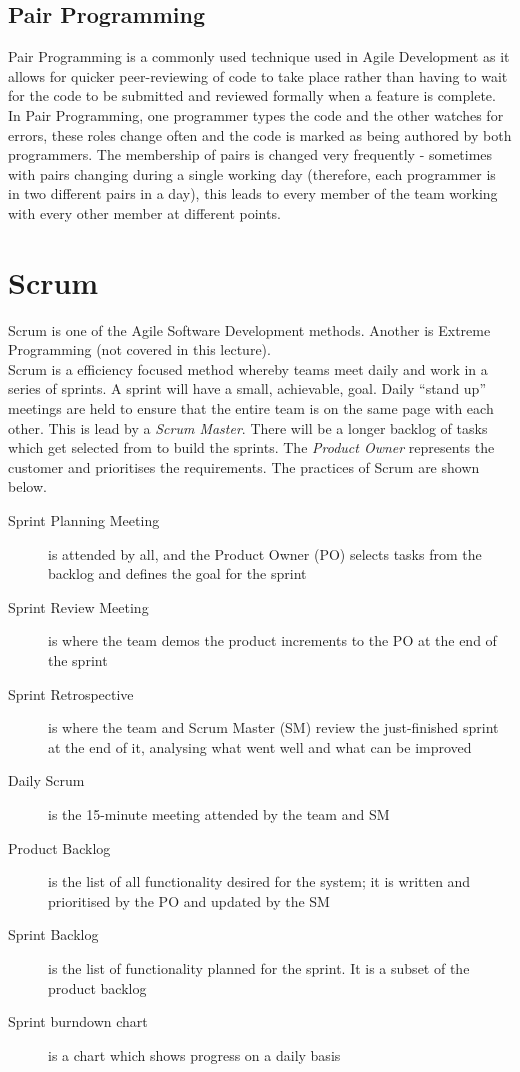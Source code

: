 \subsection{Pair Programming}
Pair Programming is a commonly used technique used in Agile Development as it allows for quicker peer-reviewing of code to take place rather than having to wait for the code to be submitted and reviewed formally when a feature is complete. In Pair Programming, one programmer types the code and the other watches for errors, these roles change often and the code is marked as being authored by both programmers. The membership of pairs is changed very frequently - sometimes with pairs changing during a single working day (therefore, each programmer is in two different pairs in a day), this leads to every member of the team working with every other member at different points.

\section{Scrum}
Scrum is one of the Agile Software Development methods. Another is Extreme Programming (not covered in this lecture).\\

Scrum is a efficiency focused method whereby teams meet daily and work in a series of sprints. A sprint will have a small, achievable, goal. Daily ``stand up'' meetings are held to ensure that the entire team is on the same page with each other. This is lead by a \textit{Scrum Master}. There will be a longer backlog of tasks which get selected from to build the sprints. The \textit{Product Owner} represents the customer and prioritises the requirements. The practices of Scrum are shown below.
\begin{description}
    \item[Sprint Planning Meeting] is attended by all, and the Product Owner (PO) selects tasks from the backlog and defines the goal for the sprint
    \item[Sprint Review Meeting] is where the team demos the product increments to the PO at the end of the sprint
    \item[Sprint Retrospective] is where the team and Scrum Master (SM) review the just-finished sprint at the end of it, analysing what went well and what can be improved
    \item[Daily Scrum] is the 15-minute meeting attended by the team and SM
    \item[Product Backlog] is the list of all functionality desired for the system; it is written and prioritised by the PO and updated by the SM
    \item[Sprint Backlog] is the list of functionality planned for the sprint. It is a subset of the product backlog
    \item[Sprint burndown chart] is a chart which shows progress on a daily basis 
\end{description}

